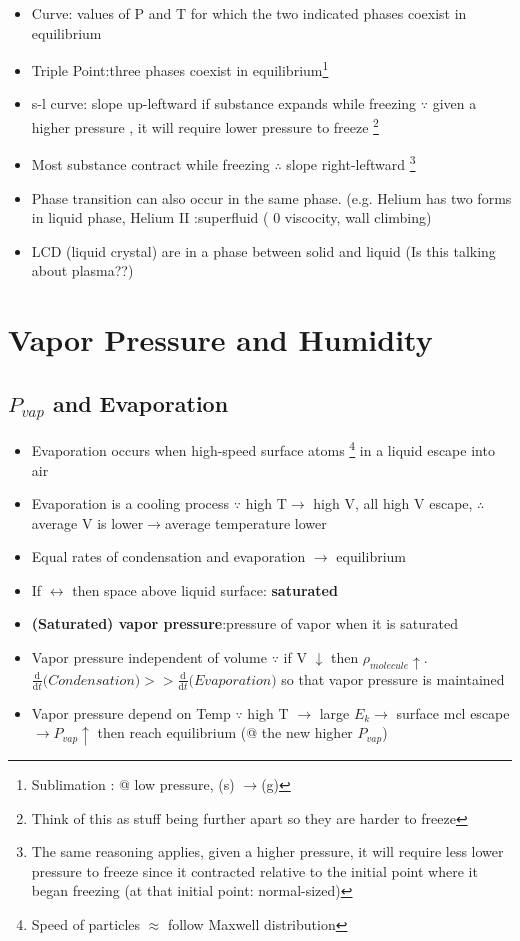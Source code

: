 \documentclass[12 pt, twoside, a4paper] {article}
\begin{document}
\begin{itemize}
\item Curve: values of P and T for which the two indicated phases coexist in equilibrium
\item Triple Point:three phases coexist in equilibrium\footnote{Sublimation : @ low pressure, (s) $\rightarrow$(g)}
\item s-l curve: slope up-leftward if substance expands while freezing  $\because$ given a higher pressure , it will require lower pressure to freeze \footnote{Think of this as stuff being further apart so they are harder to freeze}
\item Most substance contract while freezing $\therefore$ slope right-leftward \footnote{The same reasoning applies, given a higher pressure, it will require less lower pressure to freeze since it contracted relative to the initial point where it began freezing (at that initial point: normal-sized)}
\item Phase transition can also occur in the same phase. (e.g. Helium has two forms in liquid phase, Helium II :superfluid ( 0 viscocity, wall climbing)
\item LCD (liquid crystal) are in a phase between solid and liquid  (Is this talking about plasma??)
\end{itemize}

\section{Vapor Pressure and Humidity}
\subsection{$P_{vap}$ and Evaporation}
\begin{itemize}
\item Evaporation occurs when high-speed surface atoms \footnote{Speed of particles $\approx$ follow Maxwell distribution} in a liquid escape into air
\item Evaporation is a cooling process $\because$ high T$\rightarrow$ high V, all high V escape, $\therefore$ average V is lower$\rightarrow$average temperature lower
\item Equal rates of condensation and evaporation $\rightarrow$ equilibrium
\item If $\leftrightarrow$ then space above liquid surface: \textbf{saturated}
\item \textbf{(Saturated) vapor pressure}:pressure of vapor when it is saturated 
\item Vapor pressure independent of volume $\because$ if V $\downarrow$ then $\rho_{molecule} \uparrow$. $\frac{\mathrm d}{\mathrm dt} \mathrm (Condensation)>>\frac{\mathrm d}{\mathrm dt} \mathrm (Evaporation)$ so that vapor pressure is maintained
\item Vapor pressure depend on Temp $\because$ high T $\rightarrow$ large $E_k \rightarrow$ surface mcl escape $\rightarrow P_{vap} \uparrow$ then reach equilibrium (@ the new higher $P_{vap}$)
\end{itemize}
\end{document}
